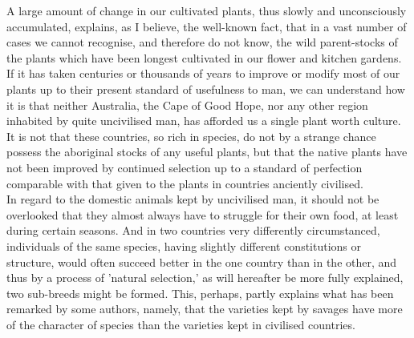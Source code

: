 \indent A large amount of change in our cultivated plants, thus slowly and unconsciously accumulated, explains, as I believe, the well-known fact, that in a vast number of cases we cannot recognise, and therefore do not know, the wild parent-stocks of the plants which have been longest cultivated in our flower and kitchen gardens. If it has taken centuries or thousands of years to improve or modify most of our plants up to their present standard of usefulness to man, we can understand how it is that neither Australia, the Cape of Good Hope, nor any other region inhabited by quite uncivilised man, has afforded us a single plant worth culture. It is not that these countries, so rich in species, do not by a strange chance possess the aboriginal stocks of any useful plants, but that the native plants have not been improved by continued selection up to a standard of perfection comparable with that given to the plants in countries anciently civilised.  \\
\indent In regard to the domestic animals kept by uncivilised man, it should not be overlooked that they almost always have to struggle for their own food, at least during certain seasons. And in two countries very differently circumstanced, individuals of the same species, having slightly different constitutions or structure, would often succeed better in the one country than in the other, and thus by a process of 'natural selection,' as will hereafter be more fully explained, two sub-breeds might be formed.  This, perhaps, partly explains what has been remarked by some authors, namely, that the varieties kept by savages have more of the character of species than the varieties kept in civilised countries.  \\
